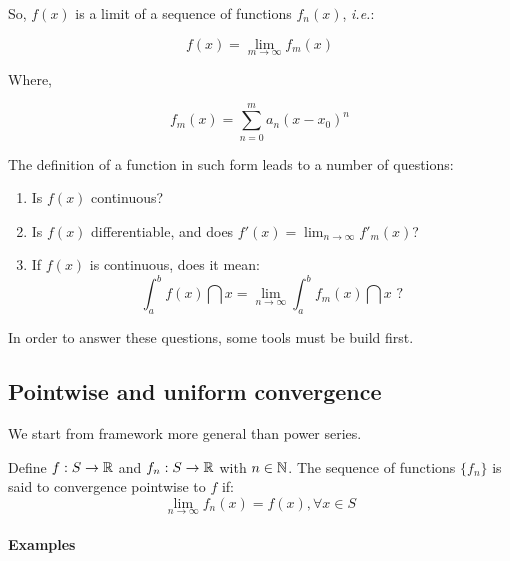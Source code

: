 So, $f(x)$ is a limit of a sequence of functions $f_n(x)$, \emph{i.e.}:

\begin{equation*}
    f(x) = \lim \limits_{m \to \infty} f_m(x)
\end{equation*}

Where,

\begin{equation*}
    f_m(x) = \sum \limits_{n=0}^m a_n(x-x_0)^n
\end{equation*}

The definition of a function in such form leads to a number of questions:
\begin{enumerate}
    \item Is $f(x)$ continuous?
    \item Is $f(x)$ differentiable, and does $f'(x) = \lim_{n \to \infty} f'_m(x)$?
    \item If $f(x)$ is continuous, does it mean:
        \begin{equation*}
            \int_a^b f(x) \dint x = \lim \limits_{n \to \infty} \int_a^b f_m(x) \dint x \text{ ?}
        \end{equation*}
\end{enumerate}

In order to answer these questions, some tools must be build first.

\subsection{Pointwise and uniform convergence}

We start from framework more general than power series.

\begin{definition}
    Define $f:S \to \mathbb{R}$ and $f_n: S \to \mathbb{R}$ with $n \in \mathbb{N}$. The sequence of functions $\{f_n\}$ is said to convergence pointwise to $f$ if:
    \begin{equation*}
        \lim \limits_{n \to \infty} f_n(x) = f(x), \forall x \in S
    \end{equation*}
\end{definition}

\paragraph{Examples}

